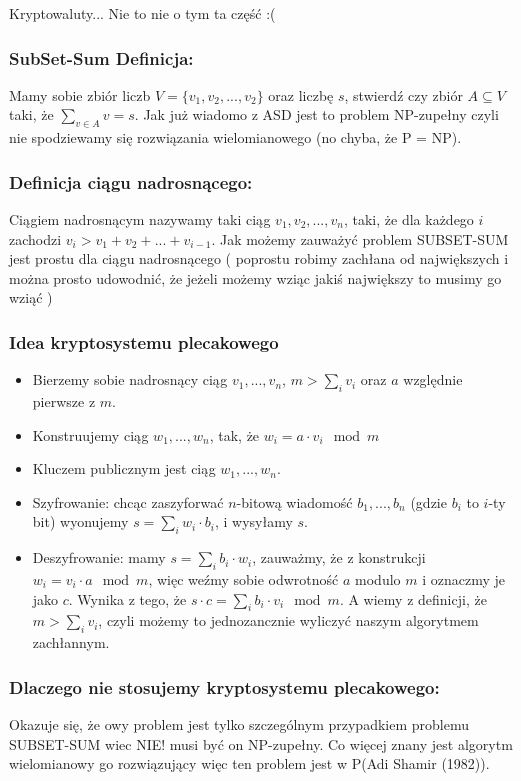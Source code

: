 Kryptowaluty... Nie to nie o tym ta część :( \newline
\subsubsection{SubSet-Sum Definicja:}
Mamy sobie zbiór liczb $V = \{v_1,v_2,...,v_2\}$ oraz liczbę $s$, stwierdź czy zbiór $A \subseteq V$ taki, że $\sum_{v \in A} v = s$.
\newline
Jak już wiadomo z ASD jest to problem NP-zupełny czyli nie spodziewamy się rozwiązania wielomianowego (no chyba, że P = NP).

\subsubsection{Definicja ciągu nadrosnącego:}
Ciągiem nadrosnącym nazywamy taki ciąg $v_1,v_2,...,v_n$, taki, że dla każdego $i$ zachodzi $v_i > v_1 + v_2 + ... + v_{i-1}$.
\newline
\newline
Jak możemy zauważyć problem SUBSET-SUM jest prostu dla ciągu nadrosnącego ( poprostu robimy zachłana od największych i można prosto udowodnić, że jeżeli możemy wziąc jakiś największy to musimy go wziąć )

\subsubsection{Idea kryptosystemu plecakowego}
\begin{itemize}
    \item Bierzemy sobie nadrosnący ciąg $v_1,...,v_n$, $m > \sum_i v_i$ oraz $a$ względnie pierwsze z $m$.
    \item Konstruujemy ciąg $w_1,...,w_n$, tak, że $w_i = a\cdot v_i \mod m$
    \item Kluczem publicznym jest ciąg $w_1,...,w_n$.
    \item Szyfrowanie: chcąc zaszyforwać $n$-bitową wiadomość $b_1,...,b_n$ (gdzie $b_i$ to $i$-ty bit) wyonujemy $s = \sum_i w_i\cdot b_i$, i wysyłamy $s$.
    \item Deszyfrowanie: mamy $s = \sum_i b_i\cdot w_i$, zauważmy, że z konstrukcji $w_i = v_i \cdot a \mod m$, więc weźmy sobie odwrotność $a$ modulo $m$ i oznaczmy je jako $c$. Wynika z tego, że $s \cdot c = \sum_i b_i \cdot v_i \mod m$. A wiemy z definicji, że $m > \sum_i v_i$, czyli możemy to jednozancznie wyliczyć naszym algorytmem zachłannym.
\end{itemize}

\subsubsection{Dlaczego nie stosujemy kryptosystemu plecakowego:}
Okazuje się, że owy problem jest tylko szczególnym przypadkiem problemu SUBSET-SUM wiec NIE! musi być on NP-zupełny. Co więcej znany jest algorytm wielomianowy go rozwiązujący więc ten problem jest w P(Adi Shamir (1982)).
